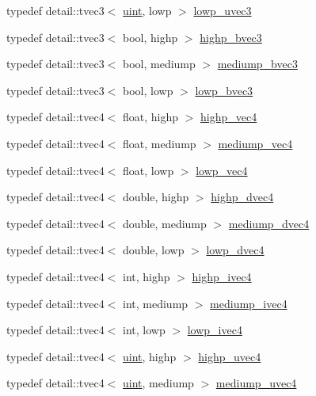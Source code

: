 \begin{CompactItemize}
typedef detail::tvec3$<$ \hyperlink{group__core__precision_g4fd29415871152bfb5abd588334147c8}{uint}, lowp $>$ \hyperlink{group__core__precision_g26fd88e52fe7003d41b0c57c5edffd6e}{lowp\_\-uvec3}
\item 
typedef detail::tvec3$<$ bool, highp $>$ \hyperlink{group__core__precision_g1d77a773fdd024602413670788c10c62}{highp\_\-bvec3}
\item 
typedef detail::tvec3$<$ bool, mediump $>$ \hyperlink{group__core__precision_ge7c8d0136e829d6fe3feb00856e35f11}{mediump\_\-bvec3}
\item 
typedef detail::tvec3$<$ bool, lowp $>$ \hyperlink{group__core__precision_g17ac2986f7b315a2ac4ee2662b5be9cb}{lowp\_\-bvec3}
\item 
typedef detail::tvec4$<$ float, highp $>$ \hyperlink{group__core__precision_ge32d5f99860247afbe7ed90564bceac1}{highp\_\-vec4}
\item 
typedef detail::tvec4$<$ float, mediump $>$ \hyperlink{group__core__precision_g2527a7f322907fecd58bef0a7a9c3ecd}{mediump\_\-vec4}
\item 
typedef detail::tvec4$<$ float, lowp $>$ \hyperlink{group__core__precision_g706ad1296c1cdcbd26c815fbb0f3f846}{lowp\_\-vec4}
\item 
typedef detail::tvec4$<$ double, highp $>$ \hyperlink{group__core__precision_gd5ff5ff4a69e6925f5b4f540e2633835}{highp\_\-dvec4}
\item 
typedef detail::tvec4$<$ double, mediump $>$ \hyperlink{group__core__precision_gc61cf2fc2df895e5f277c978dace042a}{mediump\_\-dvec4}
\item 
typedef detail::tvec4$<$ double, lowp $>$ \hyperlink{group__core__precision_gd04432e5d5accf764e10c6674e5d0c96}{lowp\_\-dvec4}
\item 
typedef detail::tvec4$<$ int, highp $>$ \hyperlink{group__core__precision_geba08fcf78aeae954c3335d73500ff8b}{highp\_\-ivec4}
\item 
typedef detail::tvec4$<$ int, mediump $>$ \hyperlink{group__core__precision_ga4c23a132d76436e041747b0c03265ad}{mediump\_\-ivec4}
\item 
typedef detail::tvec4$<$ int, lowp $>$ \hyperlink{group__core__precision_gb9b404ae623385d5094499d2d4e4616d}{lowp\_\-ivec4}
\item 
typedef detail::tvec4$<$ \hyperlink{group__core__precision_g4fd29415871152bfb5abd588334147c8}{uint}, highp $>$ \hyperlink{group__core__precision_g7cb8cc501f7e680e1889b93eb80e6c46}{highp\_\-uvec4}
\item 
typedef detail::tvec4$<$ \hyperlink{group__core__precision_g4fd29415871152bfb5abd588334147c8}{uint}, mediump $>$ \hyperlink{group__core__precision_gd90c29c2643136a9bcb1165eac47c810}{mediump\_\-uvec4}

\end{CompactItemize}

